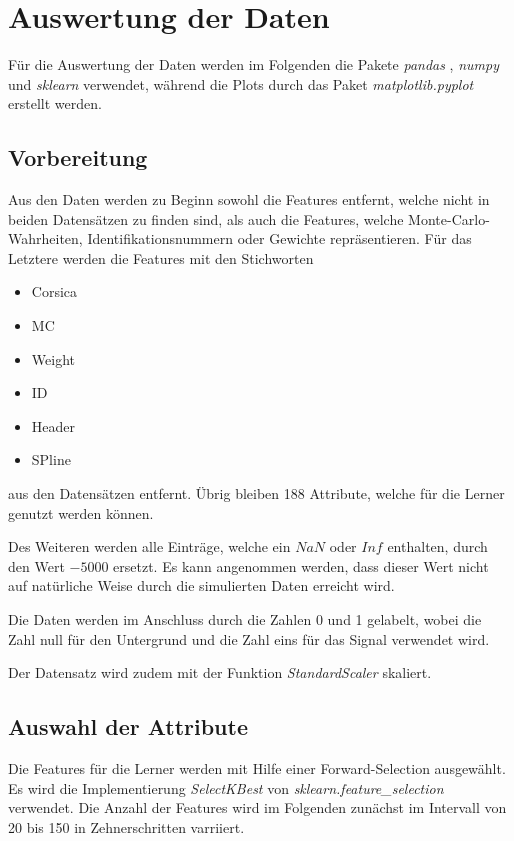 \section{Auswertung der Daten}
Für die Auswertung der Daten werden im Folgenden die Pakete \textit{pandas} \cite{pandas}, \textit{numpy} \cite{numpy} und \textit{sklearn} \cite{sklearn} verwendet, während die Plots durch das Paket \textit{matplotlib.pyplot} \cite{matplotlib} erstellt werden.

\subsection{Vorbereitung}
Aus den Daten werden zu Beginn sowohl die Features entfernt, welche nicht in beiden Datensätzen zu finden sind, als auch die Features, welche Monte-Carlo-Wahrheiten, Identifikationsnummern oder Gewichte repräsentieren. Für das Letztere werden die Features mit den Stichworten
\begin{itemize}
    \item Corsica
    \item MC
    \item Weight
    \item ID
    \item Header
    \item SPline
\end{itemize}
aus den Datensätzen entfernt. Übrig bleiben 188 Attribute, welche für die Lerner genutzt werden können.

Des Weiteren werden alle Einträge, welche ein $NaN$ oder $Inf$ enthalten, durch den Wert $-5000$ ersetzt. Es kann angenommen werden, dass dieser Wert nicht auf natürliche Weise durch die simulierten Daten erreicht wird. 

Die Daten werden im Anschluss durch die Zahlen 0 und 1 gelabelt, wobei die Zahl null für den Untergrund und die Zahl eins für das Signal verwendet wird. 

Der Datensatz wird zudem mit der Funktion \textit{StandardScaler} skaliert.

\subsection{Auswahl der Attribute}
Die Features für die Lerner werden mit Hilfe einer Forward-Selection ausgewählt. Es wird die Implementierung \textit{SelectKBest} von \textit{sklearn.feature\_selection} verwendet. Die Anzahl der Features wird im Folgenden zunächst im Intervall von 20 bis 150 in Zehnerschritten varriiert. 

